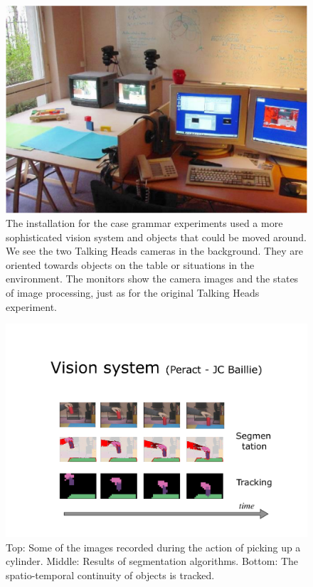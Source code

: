\begin{figure}[p]
  \centerline{\includegraphics[width=.60\textwidth]{chap10/figs/peract-setup.pdf}}
\caption{\label{fig:PERACT-setup}The installation for the case grammar experiments used a more sophisticated vision system and objects that 
could be moved around. We see the two Talking Heads cameras in 
the background. They are oriented towards objects on the table or situations in the 
environment. The monitors show the camera images and the states of image processing, just as for the original 
Talking Heads experiment. 
}
\end{figure}

\begin{figure}[p]
  \centerline{\includegraphics[width=.80\textwidth]{chap10/figs/peract-images.pdf}}
\caption{\label{fig:PERACT-images}Top: Some of the images recorded during the action of picking up a cylinder. 
Middle: Results of segmentation algorithms. 
Bottom: The spatio-temporal continuity of objects is tracked. 
}
\end{figure}


